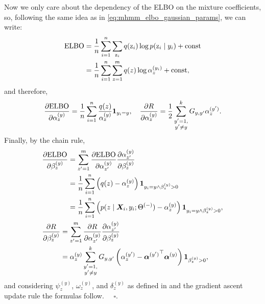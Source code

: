 Now we only care about the dependency of the ELBO on the mixture coefficients, so, following the same idea as in \eqref{eq:mhmm_elbo_gaussian_params}, we can write:
\begin{align}
	\mathrm{ELBO} &= \frac{1}{n}\sum_{i=1}^n \sum_{{\textnormal{z}}_i} q({\textnormal{z}}_i) \log p({\textnormal{z}}_i \mid y_i) + \text{const} \nonumber\\
	&= \frac{1}{n}\sum_{i=1}^n \sum_{z=1}^m q(z) \log {\alpha}^{(y_i)}_{z} + \text{const},
\end{align}
and therefore,
\begin{equation*}
	\frac{\partial \mathrm{ELBO}}{\partial {\alpha}^{(y)}_{z}} = \frac{1}{n}\sum_{i=1}^n \frac{q(z)}{{\alpha}^{(y)}_{z}} \bm{1}_{y_i=y}, \quad
	\frac{\partial R}{\partial {\alpha}^{(y)}_{z}} = \frac{1}{2}\sum_{\substack{y'=1,\\y'\neq y}}^{k} {G}_{y,y'} {\alpha}^{(y')}_{z}.
\end{equation*}
Finally, by the chain rule,
\begin{align}
	&\frac{\partial \mathrm{ELBO}}{\partial \evbeta^{(y)}_{z}} = \sum_{z'=1}^{m} \frac{\partial \mathrm{ELBO}}{\partial \evalpha^{(y)}_{z'}} \frac{\partial \evalpha^{(y)}_{z'}}{\partial \evbeta^{(y)}_{z}} \nonumber\\
	&\hphantom{\frac{\partial \mathrm{ELBO}}{\partial \evbeta^{(y)}_{z}}} = \frac{1}{n} \sum_{i=1}^n \left(q(z) - \evalpha^{(y)}_{z}\right) \1_{y_i = y \wedge \evbeta^{(y)}_{z} > 0} \nonumber\\
	&\hphantom{\frac{\partial \mathrm{ELBO}}{\partial \evbeta^{(y)}_{z}}} = \frac{1}{n} \sum_{i=1}^n \left(p(z \mid \mX_i, y_i; \Theta^{(-)}) - \evalpha^{(y)}_{z}\right) \1_{y_i = y \wedge \evbeta^{(y)}_{z} > 0}, \\
	&\frac{\partial R}{\partial \evbeta^{(y)}_{z}} = \sum_{z'=1}^{m} \frac{\partial R}{\partial \evalpha^{(y)}_{z'}} \frac{\partial \evalpha^{(y)}_{z'}}{\partial \evbeta^{(y)}_{z}} \nonumber\\
	&\hphantom{\frac{\partial R}{\partial \evbeta^{(y)}_{z}}} = \evalpha^{(y)}_{z} \sum_{\substack{y'=1,\\y'\neq y}}^{k} \emG_{y,y'} \left(\evalpha^{(y')}_{z} - {\valpha^{(y')}} \transp \valpha^{(y)} \right) \1_{\evbeta^{(y)}_{z} > 0},
\end{align}
and considering $\psi^{(y)}_{z}$, $\omega^{(y)}_{z}$, and $\delta^{(y)}_z$ as defined in  and the gradient ascent update rule the formulas follow. $\quad \square$.

